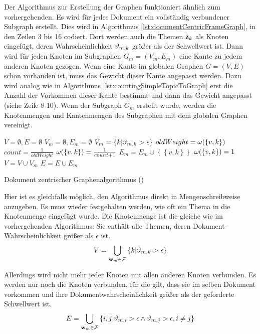 Der Algorithmus zur Erstellung der Graphen funktioniert ähnlich zum vorhergehenden. Es wird für jedes Dokument ein vollständig verbundener Subgraph erstellt. Dies wird in Algorithmus \ref{lst:documentCentricFrameGraph}, in den Zeilen 3 bis 16 codiert. Dort werden auch die Themen $\mathbf{z}_k$ als Knoten eingefügt, deren Wahrscheinlichkeit $\vartheta_{m,k}$ größer als der Schwellwert ist. Dann wird für jeden Knoten im Subgraphen $G_m=(V_m,E_m)$ eine Kante zu jedem anderen Knoten gezogen. Wenn eine Kante im globalen Graphen $G=(V,E)$ schon vorhanden ist, muss das Gewicht dieser Kante angepasst werden. Dazu wird analog wie in Algorithmus \ref{lst:countingSimpleTopicToGraph} erst die Anzahl der Vorkommen dieser Kante bestimmt und dann das Gewicht angepasst (siehe Zeile 8-10). Wenn der Subgraph $G_m$ erstellt wurde, werden die Knotenmengen und Kantenmengen des Subgraphen mit dem globalen Graphen vereinigt. 

\begin{algorithm}[ht]
\begin{algorithmic}[1]
\STATE $V = \emptyset, E = \emptyset$
  \STATE $V_m = \emptyset, E_m = \emptyset$
  \STATE $V_m = \left\lbrace k | \vartheta_{m,k} > \epsilon \right\rbrace$
        \STATE $oldWeight = \omega(\left\lbrace v,k \right\rbrace)$ 
        \STATE $count = \frac{1}{oldWeight}$	
	    \STATE $\omega(\left\lbrace v,k \right\rbrace) = \frac{1}{count + 1}$
      \ELSE
        \STATE $E_m = E_m \cup \left\lbrace \left\lbrace v,k \right\rbrace \right\rbrace$
        \STATE $\omega(\left\lbrace v,k \right\rbrace) = 1$
      \ENDIF
    \ENDFOR
  \ENDFOR
  \STATE $V = V \cup V_m$
  \STATE $E = E \cup E_m$
\ENDFOR 
\end{algorithmic}
\label{lst:documentCentricFrameGraph}
\caption{Dokument zentrischer Graphenalgorithmus (\CDC)}
\end{algorithm}

Hier ist es gleichfalls möglich, den Algorithmus direkt in Mengenschreibweise anzugeben. Es muss wieder festgehalten werden, wie oft ein Thema in die Knotenmenge eingefügt wurde. Die Knotenmenge ist die gleiche wie im vorhergehenden Algorithmus: Sie enthält alle Themen, deren Dokument-Wahrscheinlichkeit größer als $\epsilon$ ist. 
\[
V = \bigcup_{\mathbf{w}_m \in \mathcal{F}} \left\{ k | \vartheta_{m,k} > \epsilon\right\}
\]

Allerdings wird nicht mehr jeder Knoten mit allen anderen Knoten verbunden. Es werden nur noch die Knoten verbunden, für die gilt, dass sie im selben Dokument vorkommen und ihre Dokumentwahrscheinlichkeit größer als der geforderte Schwellwert ist. 
\[
E = \bigcup_{\mathbf{w}_m \in \mathcal{F}} \left\{ {i,j} | \vartheta_{m,i} > \epsilon \wedge \vartheta_{m,j} > \epsilon, i \neq j \right\}
\]

